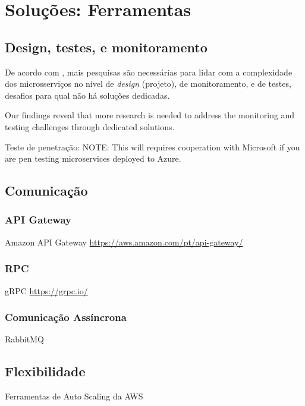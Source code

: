 \chapter{Soluções: Ferramentas}\label{chapter-solucoes}


\section{Design, testes, e monitoramento}

De acordo com , mais pesquisas são necessárias para lidar com a complexidade dos microsserviços no nível de \emph{design} (projeto), de monitoramento, e de testes, desafios para qual não há soluções dedicadas.

Our findings reveal that more research is needed to address the monitoring and testing challenges through dedicated solutions. \cite{design-monitoring-testing-waseem}

Teste de penetração: NOTE: This will requires cooperation with Microsoft if you are pen testing microservices deployed to Azure.

\section{Comunicação}

\subsection*{API Gateway}
Amazon API Gateway \url{https://aws.amazon.com/pt/api-gateway/} 

\subsection*{RPC}
gRPC \url{https://grpc.io/}

\subsection*{Comunicação Assíncrona}
RabbitMQ

\section{Flexibilidade}
Ferramentas de Auto Scaling da AWS

